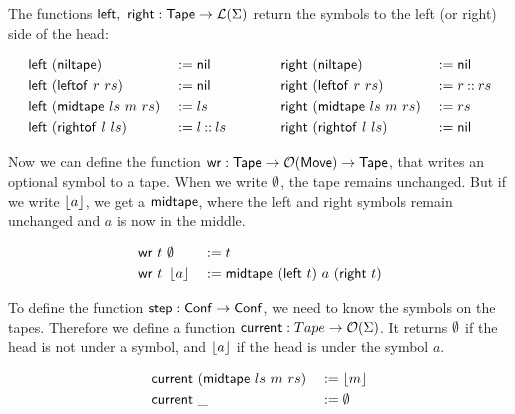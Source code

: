 The functions $\mathsf{left},~\mathsf{right} : \mathsf{Tape} \rightarrow \mathcal{L}(\Sigma)$ return the symbols to the left (or right) side of the head:
\begin{definition}
  \begin{alignat*}{4}
    \mathsf{left} &~(\mathsf{niltape})                 &&:= \mathsf{nil}
    \quad\quad\quad\quad
    & \mathsf{right}&~(\mathsf{niltape})               &&:= \mathsf{nil} \\
    \mathsf{left} &~(\mathsf{leftof}~{r}~{rs})         &&:= \mathsf{nil}
    & \mathsf{right}&~(\mathsf{leftof}~{r}~{rs})       &&:= r \mathbin{::} rs \\
    \mathsf{left} &~(\mathsf{midtape}~{ls}~{m}~{rs})   &&:= ls
    & \mathsf{right}&~(\mathsf{midtape}~{ls}~{m}~{rs}) &&:= rs \\
    \mathsf{left} &~(\mathsf{rightof}~{l}~{ls})        &&:= l \mathbin{::} ls
    & \mathsf{right}&~(\mathsf{rightof}~{l}~{ls})      &&:= \mathsf{nil}
  \end{alignat*}
\end{definition}


Now we can define the function $\mathsf{wr} : \mathsf{Tape} \rightarrow \mathcal{O}(\mathsf{Move}) \rightarrow \mathsf{Tape}$, that writes an optional symbol to a tape.  When we write $\emptyset$,
the tape remains unchanged.  But if we write $\left\lfloor {a} \right\rfloor$, we get a $\mathsf{midtape}$, where the left and right symbols remain unchanged and $a$ is now in
the middle.

\begin{definition}[$\MS{wr}$]
  \begin{alignat*}{3}
    \mathsf{wr}~t &~ \emptyset   &&:= t \\
    \mathsf{wr}~t &~ \left\lfloor {a} \right\rfloor &&:= \mathsf{midtape}~(\mathsf{left}~t)~{a}~(\mathsf{right}~t)
  \end{alignat*}
\end{definition}

To define the function $\mathsf{step} : \mathsf{Conf} \rightarrow \mathsf{Conf}$, we need to know the symbols on the tapes.  Therefore we define a function
$\mathsf{current} : Tape \rightarrow \mathcal{O}(\Sigma)$.  It returns $\emptyset$ if the head is not under a symbol, and $\left\lfloor {a} \right\rfloor$ if the head is under the symbol
$a$.

\begin{definition}[$\MS{current}$]
  \begin{alignat*}{2}
    \mathsf{current}&~(\mathsf{midtape}~{ls}~{m}~{rs})&&:= \left\lfloor {m} \right\rfloor \\
    \mathsf{current}&~\_                          &&:= \emptyset
  \end{alignat*}
\end{definition}

